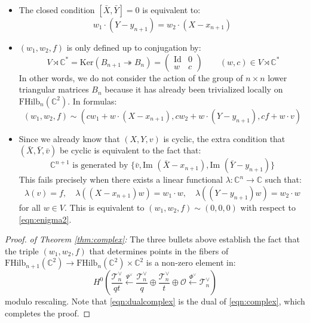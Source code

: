 \documentclass[12pt]{amsart}
\numberwithin{equation}{section}
\theoremstyle{definition}
\theoremstyle{remark}
\newcommand{\CC}{\mathbb{C}}
\newcommand{\CO}{\mathcal{O}}
\newcommand{\CT}{\mathcal{T}}
\renewcommand{\1}{\mathbf{1}}
\newcommand{\FH}{\mathrm{FHilb}}
\begin{document}
\begin{itemize} 

\item The closed condition $[\bar{X}, \bar{Y}] = 0$ is equivalent to:
\begin{equation}
\label{eqn:enigma1}
w_1 \cdot (Y - y_{n+1}) = w_2 \cdot (X - x_{n+1})
\end{equation}

\item $(w_1, w_2,f)$ is only defined up to conjugation by:
$$\
V \rtimes \CC^* = \text{Ker}(B_{n+1} \twoheadrightarrow B_n) = \left( \begin{array}{cc}
\text{Id} & 0 \\
w & c \end{array} \right) \qquad (w,c) \in V \rtimes \CC^*
$$
In other words, we do not consider the action of the group of $n \times n$ lower triangular matrices $B_n$ because it has already been trivialized locally on $\FH_n(\CC^2)$. In formulas:
\begin{equation}
\label{eqn:enigma2}
(w_1, w_2,f) \sim \left( cw_1 + w \cdot (X-x_{n+1}),cw_2 + w \cdot (Y-y_{n+1}),cf + w \cdot v \right) 
\end{equation}

\item Since we already know that $(X,Y,v)$ is cyclic, the extra condition that $(\bar{X}, \bar{Y}, \bar{v})$ be cyclic is equivalent to the fact that:
\begin{equation}
\label{eqn:equivalent}
\CC^{n+1} \text{ is generated by } \Big\{ \bar{v},\text{Im }(\bar{X}-x_{n+1}), \text{Im }(\bar{Y}-y_{n+1}) \Big\}
\end{equation}
This fails precisely when there exists a linear functional $\lambda : \CC^n \rightarrow \CC$ such that:
$$
\lambda(v) = f, \quad \lambda \left((X-x_{n+1})w \right) = w_1 \cdot w, \quad \lambda \left((Y-y_{n+1})w \right) = w_2 \cdot w
$$
for all $w \in V$. This is equivalent to $(w_1,w_2,f) \sim (0,0,0)$ with respect to \eqref{eqn:enigma2}. 

\end{itemize}

\begin{proof} \emph{of Theorem \ref{thm:complex}:}  The three bullets above establish the fact that the triple $(w_1,w_2,f)$ that determines points in the fibers of $\FH_{n+1}(\CC^2) \rightarrow \FH_n(\CC^2) \times \CC^2$ is a non-zero element in:
\begin{equation}
\label{eqn:dualcomplex}
H^0\left( \frac {\CT^\vee_{n}}{qt} \stackrel{\Psi^\vee}\longleftarrow \frac {\CT^\vee_n}q \oplus \frac {\CT_n^\vee}t \oplus \CO \stackrel{\Phi^\vee}\longleftarrow \CT_n^\vee \right)
\end{equation}
modulo rescaling. Note that \eqref{eqn:dualcomplex} is the dual of \eqref{eqn:complex}, which completes the proof. 

\end{proof}
\end{document}
